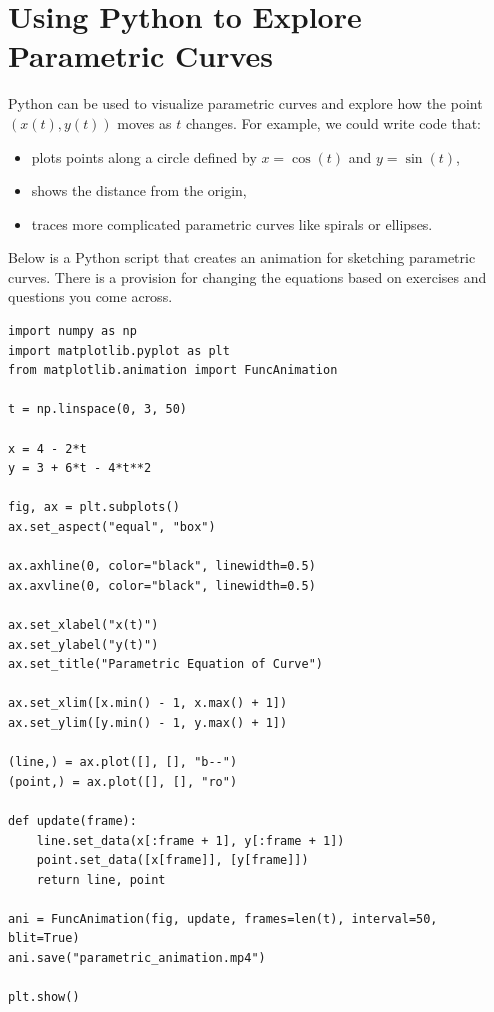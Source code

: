 \section{Using Python to Explore Parametric Curves}

Python can be used to visualize parametric curves and explore how the point $(x(t), y(t))$ moves as $t$ changes. For example, we could write code that:
\begin{itemize}
    \item plots points along a circle defined by $x = \cos(t)$ and $y = \sin(t)$,
    \item shows the distance from the origin,
    \item traces more complicated parametric curves like spirals or ellipses.
\end{itemize}

Below is a Python script that creates an animation for sketching parametric curves. There is a provision for changing the equations based on exercises and questions you come across.

\begin{verbatim}
import numpy as np
import matplotlib.pyplot as plt
from matplotlib.animation import FuncAnimation

t = np.linspace(0, 3, 50)

x = 4 - 2*t
y = 3 + 6*t - 4*t**2

fig, ax = plt.subplots()
ax.set_aspect("equal", "box")

ax.axhline(0, color="black", linewidth=0.5)
ax.axvline(0, color="black", linewidth=0.5)

ax.set_xlabel("x(t)")
ax.set_ylabel("y(t)")
ax.set_title("Parametric Equation of Curve")

ax.set_xlim([x.min() - 1, x.max() + 1])
ax.set_ylim([y.min() - 1, y.max() + 1])

(line,) = ax.plot([], [], "b--")
(point,) = ax.plot([], [], "ro")

def update(frame):
    line.set_data(x[:frame + 1], y[:frame + 1])
    point.set_data([x[frame]], [y[frame]])
    return line, point

ani = FuncAnimation(fig, update, frames=len(t), interval=50, blit=True)
ani.save("parametric_animation.mp4")

plt.show()
\end{verbatim}

